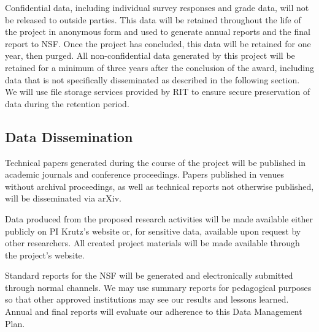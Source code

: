 \documentclass[11pt]{article}
\begin{document}
Confidential data, including individual survey responses and grade data, will not be released to outside parties. This data will be retained throughout the life of the project in anonymous form and used to generate annual reports and the final report to NSF. Once the project has concluded, this data will be retained for one year, then purged. All non-confidential data generated by this project will be retained for a minimum of three years after the conclusion of the award, including data that is not specifically disseminated as described in the following section. We will use file storage services provided by RIT to ensure secure preservation of data during the retention period.


\subsection*{Data Dissemination}

Technical papers generated during the course of the project will be published in academic journals and conference proceedings. Papers published in venues without archival proceedings, as well as technical reports not otherwise published, will be disseminated via arXiv.


Data produced from the proposed research activities will be made available either publicly on PI Krutz's website or, for sensitive data, available upon request by other researchers. All created project materials will be made available through the project's website.

Standard reports for the NSF will be generated and electronically submitted through normal channels. We may use summary reports for pedagogical purposes so that other approved institutions may see our results and lessons learned. Annual and final reports will evaluate our adherence to this Data Management Plan. %
\end{document}
